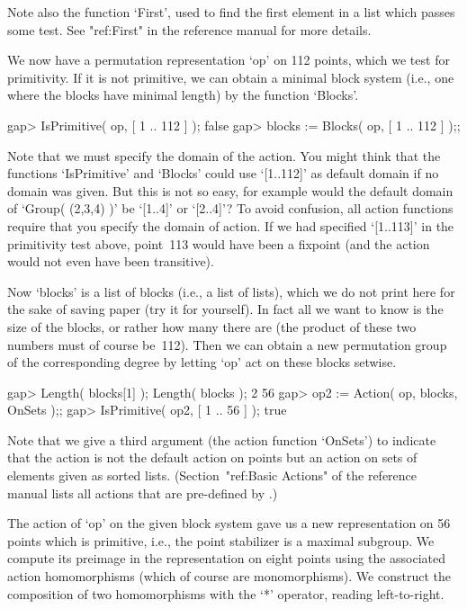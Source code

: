 Note also  the function `First', used to  find the  first element in a
list which  passes some test. See  "ref:First" in the reference manual
for more details.

We now have a permutation representation `op' on 112 points, which we
test for primitivity. If it is not primitive, we can obtain a minimal
block system (i.e., one where the blocks have minimal length) by the
function `Blocks'.

\beginexample
gap> IsPrimitive( op, [ 1 .. 112 ] );
false
gap> blocks := Blocks( op, [ 1 .. 112 ] );;
\endexample

Note that we  must specify the domain  of the action. You  might think
that the   functions `IsPrimitive' and `Blocks'  could  use `[1..112]' as
default  domain if no  domain was  given. But  this  is not so  easy, for
example  would the default domain  of `Group(  (2,3,4)  )' be `[1..4]' or
`[2..4]'? To  avoid confusion, all action  functions  require that you
specify  the domain of action. If  we had specified  `[1..113]' in the
primitivity test above,  point~113  would have been  a fixpoint  (and the
action would not even have been transitive).

Now `blocks' is a list of blocks (i.e., a list of lists), which we do not
print  here for the  sake of saving paper (try  it for yourself). In fact
all we want to know is the size of  the blocks, or  rather how many there
are (the product of these two numbers must of course be~112). Then we can
obtain a new  permutation group  of the  corresponding  degree by letting
`op' act on these blocks setwise.

\beginexample
gap> Length( blocks[1] );  Length( blocks );
2
56
gap> op2 := Action( op, blocks, OnSets );;
gap> IsPrimitive( op2, [ 1 .. 56 ] );
true
\endexample

Note that we give a third argument (the action function `OnSets') to
indicate that the action is not the default action on points but an
action on sets of elements given as sorted lists.
(Section~"ref:Basic Actions" of the reference manual lists all
actions that are pre-defined by {\GAP}.)

The action of `op' on the given block system gave us a new representation
on 56 points which is primitive, i.e., the  point stabilizer is a maximal
subgroup. We  compute its preimage in the  representation on eight points
using the   associated   action homomorphisms (which   of   course are
monomorphisms). We construct  the  composition of two  homomorphisms with
the `*' operator, reading left-to-right.

